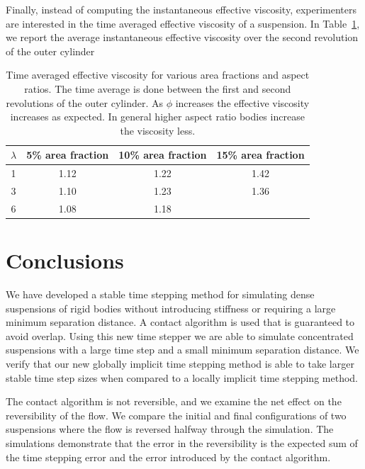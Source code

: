 \documentclass[preprint, 10pt]{elsarticle}
\begin{document}
Finally, instead of computing the instantaneous effective viscosity,
experimenters are interested in the time averaged effective viscosity of
a suspension. In Table~\ref{tab:viscosity}, we report the average
instantaneous effective viscosity over the second revolution of the
outer cylinder
\begin{table}[!h]
\begin{center}
\begin{tabular}{c| c | c |  c}
$\lambda$ & 5\% area fraction  & 10\% area fraction  & 15\% area fraction\\
\hline
1 & 1.12 & 1.22 & 1.42 \\
3 & 1.10 & 1.23 & 1.36 \\
6 & 1.08 & 1.18 & 
\end{tabular}
\end{center}
\caption{Time averaged effective viscosity for various area fractions
and aspect ratios. The time average is done between the first and second
revolutions of the outer cylinder. As $\phi$ increases the effective
viscosity increases as expected. In general higher aspect ratio bodies
increase the viscosity less. }\label{tab:viscosity}
\end{table}



\FloatBarrier
\section{Conclusions\label{s:conclusions}}
We have developed a stable time stepping method for
simulating dense suspensions of rigid bodies without introducing
stiffness or requiring a large minimum separation distance.  A contact
algorithm is used that is guaranteed to avoid overlap.  Using this new
time stepper we are able to simulate concentrated suspensions with a
large time step and a small minimum separation distance.  We verify that
our new globally implicit time stepping method is able to take
larger stable time step sizes when compared to a locally implicit
time stepping method.

The contact algorithm is not reversible, and we examine the net effect
on the reversibility of the flow.  We compare the initial and final
configurations of two suspensions where the flow is reversed halfway
through the simulation.  The simulations demonstrate that the error in
the reversibility is the expected sum of the time stepping error and the
error introduced by the contact algorithm.
\end{document}
